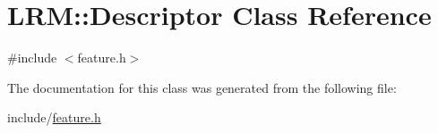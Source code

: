 \hypertarget{classLRM_1_1Descriptor}{\section{\-L\-R\-M\-:\-:\-Descriptor \-Class \-Reference}
\label{classLRM_1_1Descriptor}
}


{\ttfamily \#include $<$feature.\-h$>$}



\-The documentation for this class was generated from the following file\-:\begin{DoxyCompactItemize}
\item 
include/\hyperlink{feature_8h}{feature.\-h}\end{DoxyCompactItemize}
